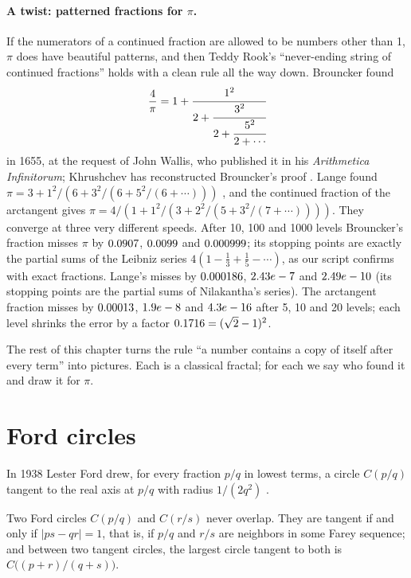 \paragraph{A twist: patterned fractions for $\pi$.} If the numerators of a continued fraction are allowed to be numbers other than 1, $\pi$ does have beautiful patterns, and then Teddy Rook's ``never-ending string of continued fractions'' holds with a clean rule all the way down. Brouncker found
\begin{equation}\label{eq:brouncker}
  \frac{4}{\pi} = 1 + \cfrac{1^2}{2 + \cfrac{3^2}{2 + \cfrac{5^2}{2 + \cdots}}}
\end{equation}
in 1655, at the request of John Wallis, who published it in his \emph{Arithmetica Infinitorum}; Khrushchev has reconstructed Brouncker's proof \citep{Khrushchev2006}. Lange found $\pi = 3 + 1^2/(6 + 3^2/(6 + 5^2/(6 + \cdots)))$ \citep{Lange1999}, and the continued fraction of the arctangent gives $\pi = 4/(1 + 1^2/(3 + 2^2/(5 + 3^2/(7 + \cdots))))$. They converge at three very different speeds. After 10, 100 and 1000 levels Brouncker's fraction misses $\pi$ by $0.0907$, $0.0099$ and $0.000999$; its stopping points are exactly the partial sums of the Leibniz series $4(1 - \frac13 + \frac15 - \cdots)$, as our script confirms with exact fractions. Lange's misses by $0.000186$, $2.43e-7$ and $2.49e-10$ (its stopping points are the partial sums of Nilakantha's series). The arctangent fraction misses by $0.00013$, $1.9e-8$ and $4.3e-16$ after 5, 10 and 20 levels; each level shrinks the error by a factor $0.1716 = (\sqrt2 - 1)^2$.

The rest of this chapter turns the rule ``a number contains a copy of itself after every term'' into pictures. Each is a classical fractal; for each we say who found it and draw it for $\pi$.

\section{Ford circles}

In 1938 Lester Ford drew, for every fraction $p/q$ in lowest terms, a circle $C(p/q)$ tangent to the real axis at $p/q$ with radius $1/(2q^2)$ \citep{Ford1938}.

\begin{proposition}[Ford]\label{prop:ford}
Two Ford circles $C(p/q)$ and $C(r/s)$ never overlap. They are tangent if and only if $|ps - qr| = 1$, that is, if $p/q$ and $r/s$ are neighbors in some Farey sequence; and between two tangent circles, the largest circle tangent to both is $C\big((p+r)/(q+s)\big)$.
\end{proposition}

